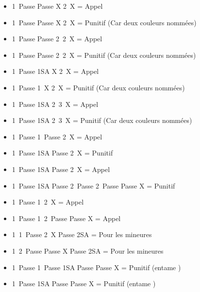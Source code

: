 \documentclass[a4paper, oneside, 11pt]{report}
\begin{document}
\begin{itemize}
		\item 1\pique\ Passe Passe X 2\pique\ X = Appel
		\item 1\pique\ Passe Passe X 2\carreau\ X = Punitif (Car deux couleurs nommées)
		\item 1\pique\ Passe Passe 2\trefle\ 2\pique\ X = Appel
		\item 1\pique\ Passe Passe 2\trefle\ 2\carreau\ X = Punitif (Car deux couleurs nommées)
		\item 1\carreau\ Passe 1SA X 2\carreau\ X = Appel
		\item 1\carreau\ Passe 1\coeur\ X 2\carreau\ X = Punitif (Car deux couleurs nommées)
		\item 1\carreau\ Passe 1SA 2\pique\ 3\carreau\ X = Appel
		\item 1\carreau\ Passe 1SA 2\pique\ 3\trefle\ X = Punitif (Car deux couleurs nommées)\\
	
		\item 1\coeur\ Passe 1\pique\ Passe 2\coeur\ X = Appel
		\item 1\coeur\ Passe 1SA Passe 2\coeur\ X = Punitif
		\item 1\coeur\ Passe 1SA Passe 2\trefle\ X  = Appel
		\item 1\coeur\ Passe 1SA Passe 2\trefle\ Passe 2\coeur\ Passe Passe X  = Punitif\\
	
		\item 1\carreau\ Passe 1\coeur\ 2\coeur\ X = Appel
		\item 1\carreau\ Passe 1\coeur\ 2\coeur\ Passe Passe X = Appel\\
		
		\item 1\trefle\ 1\coeur\ Passe 2\coeur\ X Passe 2SA = Pour les mineures
		\item 1\trefle\ 2\coeur\ Passe Passe X Passe 2SA = Pour les mineures\\
		
		\item 1\trefle\ Passe 1\pique\ Passe 1SA Passe Passe X = Punitif (entame \pique)
		\item 1\pique\ Passe 1SA Passe Passe X = Punitif (entame \pique)
		\end{itemize}
\end{document}
